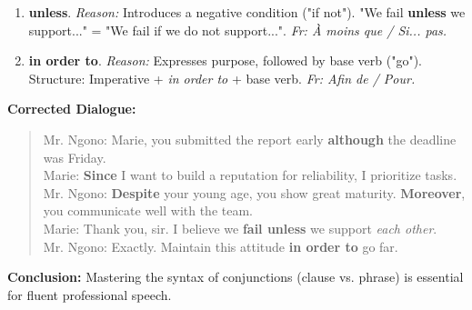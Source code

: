\documentclass[11pt]{article}
\begin{document}
\begin{exoresolu}
\begin{enumerate}
        \item \textbf{unless}. \textit{Reason:} Introduces a negative condition ("if not"). "We fail \textbf{unless} we support..." = "We fail if we do not support...". \textit{Fr: À moins que / Si... pas.}
        \item \textbf{in order to}. \textit{Reason:} Expresses purpose, followed by base verb ("go"). Structure: Imperative + \emph{in order to} + base verb. \textit{Fr: Afin de / Pour.}
    \end{enumerate}
    \textbf{Corrected Dialogue:}
    \begin{quote}
    Mr. Ngono: Marie, you submitted the report early \textbf{although} the deadline was Friday.\\
    Marie: \textbf{Since} I want to build a reputation for reliability, I prioritize tasks.\\
    Mr. Ngono: \textbf{Despite} your young age, you show great maturity. \textbf{Moreover}, you communicate well with the team.\\
    Marie: Thank you, sir. I believe we \textbf{fail unless} we support \emph{each other}.\\
    Mr. Ngono: Exactly. Maintain this attitude \textbf{in order to} go far.
    \end{quote}
    \textbf{Conclusion:} Mastering the syntax of conjunctions (clause vs. phrase) is essential for fluent professional speech.
\end{exoresolu}
\end{document}
